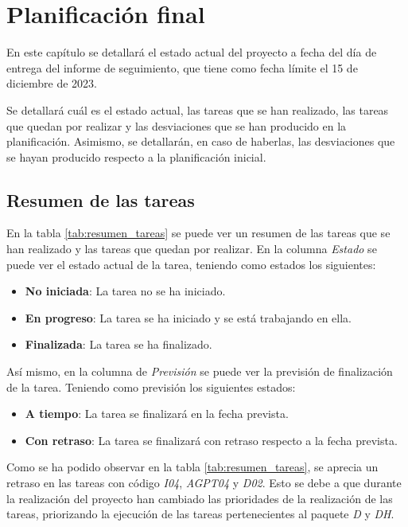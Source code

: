 \section{Planificación final}
\label{sec:planificacion_final}


En este capítulo se detallará el estado actual del proyecto a fecha del día
de entrega del informe de seguimiento, que tiene como fecha límite el 15 de
diciembre de 2023.

Se detallará cuál es el estado actual, las tareas que se han realizado, las tareas
que quedan por realizar y las desviaciones que se han producido en la planificación.
Asimismo, se detallarán, en caso de haberlas, las desviaciones que se hayan
producido respecto a la planificación inicial.

\subsection{Resumen de las tareas}
\label{subsec:resumen_tareas}


En la tabla \ref{tab:resumen_tareas} se puede ver un resumen de las tareas que se han realizado
y las tareas que quedan por realizar. En la columna \textit{Estado} se puede ver el estado actual
de la tarea, teniendo como estados los siguientes:

\begin{itemize}
    \item \textbf{No iniciada}: La tarea no se ha iniciado.
    \item \textbf{En progreso}: La tarea se ha iniciado y se está trabajando en ella.
    \item \textbf{Finalizada}: La tarea se ha finalizado.
\end{itemize}

Así mismo, en la columna de \textit{Previsión} se puede ver la previsión de finalización de la tarea.
Teniendo como previsión los siguientes estados:

\begin{itemize}
    \item \textbf{A tiempo}: La tarea se finalizará en la fecha prevista.
    \item \textbf{Con retraso}: La tarea se finalizará con retraso respecto a la fecha prevista.
\end{itemize}

Como se ha podido observar en la tabla \ref{tab:resumen_tareas}, se aprecia un
retraso en las tareas con código \textit{I04}, \textit{AGPT04} y \textit{D02}.
Esto se debe a que durante la realización del proyecto han cambiado las prioridades
de la realización de las tareas, priorizando la ejecución de las tareas pertenecientes
al paquete \textit{D} y \textit{DH}.

